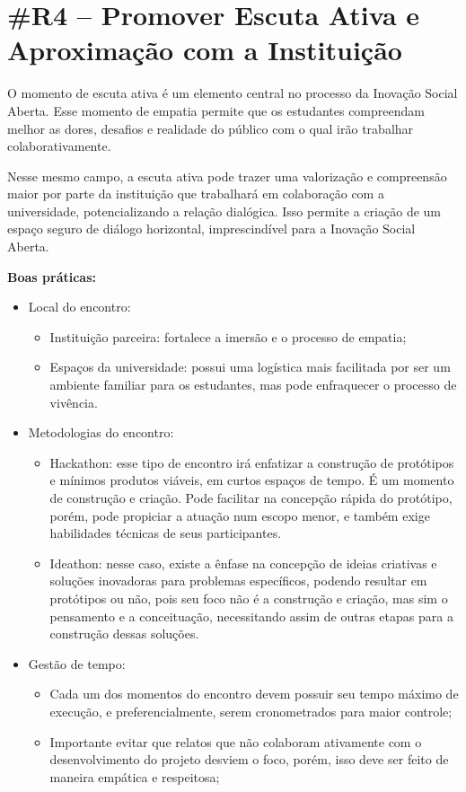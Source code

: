 \section*{\#R4 – Promover Escuta Ativa e Aproximação com a Instituição}

O momento de escuta ativa é um elemento central no processo da Inovação Social Aberta. Esse momento de empatia permite que os estudantes compreendam melhor as dores, desafios e realidade do público com o qual irão trabalhar colaborativamente.

Nesse mesmo campo, a escuta ativa pode trazer uma valorização e compreensão maior por parte da instituição que trabalhará em colaboração com a universidade, potencializando a relação dialógica. Isso permite a criação de um espaço seguro de diálogo horizontal, imprescindível para a Inovação Social Aberta.

\textbf{Boas práticas:}
\begin{itemize}
    \item Local do encontro:
    \begin{itemize}
            \item Instituição parceira: fortalece a imersão e o processo de empatia;
            \item Espaços da universidade: possui uma logística mais facilitada por ser um ambiente familiar para os estudantes, mas pode enfraquecer o processo de vivência.
    \end{itemize}

    \item Metodologias do encontro:
    \begin{itemize}
            \item Hackathon: esse tipo de encontro irá enfatizar a construção de protótipos e mínimos produtos viáveis, em curtos espaços de tempo. É um momento de construção e criação. Pode facilitar na concepção rápida do protótipo, porém, pode propiciar a atuação num escopo menor, e também exige habilidades técnicas de seus participantes.
            \item Ideathon: nesse caso, existe a ênfase na concepção de ideias criativas e soluções inovadoras para problemas específicos, podendo resultar em protótipos ou não, pois seu foco não é a construção e criação, mas sim o pensamento e a conceituação, necessitando assim de outras etapas para a construção dessas soluções.
    \end{itemize}

    \item Gestão de tempo:
    \begin{itemize}
            \item Cada um dos momentos do encontro devem possuir seu tempo máximo de execução, e preferencialmente, serem cronometrados para maior controle;
            \item Importante evitar que relatos que não colaboram ativamente com o desenvolvimento do projeto desviem o foco, porém, isso deve ser feito de maneira empática e respeitosa;
    \end{itemize}
\end{itemize}

